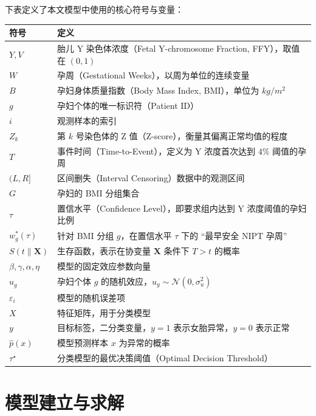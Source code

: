 \documentclass[withoutpreface]{cumcmthesis}
\begin{document}
下表定义了本文模型中使用的核心符号与变量：

\begin{table}[H]
  \centering
  \renewcommand{\arraystretch}{1.2}
  \begin{tabular}{ll}
  \hline
  \textbf{符号} & \textbf{定义} \\ \hline
  $Y, V$ & 胎儿 Y 染色体浓度（Fetal Y-chromosome Fraction, FFY），取值在 $(0,1)$ \\
  $W$ & 孕周（Gestational Weeks），以周为单位的连续变量 \\
  $B$ & 孕妇身体质量指数（Body Mass Index, BMI），单位为 $kg/m^2$ \\
  $g$ & 孕妇个体的唯一标识符（Patient ID） \\
  $i$ & 观测样本的索引 \\
  $Z_k$ & 第 $k$ 号染色体的 Z 值（Z-score），衡量其偏离正常均值的程度 \\
  $T$ & 事件时间（Time-to-Event），定义为 Y 浓度首次达到 $4\%$ 阈值的孕周 \\
  $(L,R]$ & 区间删失（Interval Censoring）数据中的观测区间 \\
  $G$ & 孕妇的 BMI 分组集合 \\
  $\tau$ & 置信水平（Confidence Level），即要求组内达到 Y 浓度阈值的孕妇比例 \\
  $w_g^*(\tau)$ & 针对 BMI 分组 $g$，在置信水平 $\tau$ 下的 “最早安全 NIPT 孕周” \\
  $S(t \| \mathbf{X})$ & 生存函数，表示在协变量 $\mathbf{X}$ 条件下 $T>t$ 的概率 \\
  $\beta, \gamma, \alpha, \eta$ & 模型的固定效应参数向量 \\
  $u_g$ & 孕妇个体 $g$ 的随机效应，$u_g \sim \mathcal{N}(0,\sigma_u^2)$ \\
  $\varepsilon_i$ & 模型的随机误差项 \\
  $X$ & 特征矩阵，用于分类模型 \\
  $y$ & 目标标签，二分类变量，$y=1$ 表示女胎异常，$y=0$ 表示正常 \\
  $\hat{p}(x)$ & 模型预测样本 $x$ 为异常的概率 \\
  $\tau^\star$ & 分类模型的最优决策阈值（Optimal Decision Threshold） \\ \hline
  \end{tabular}
  \end{table}


\section{模型建立与求解}
\end{document}
